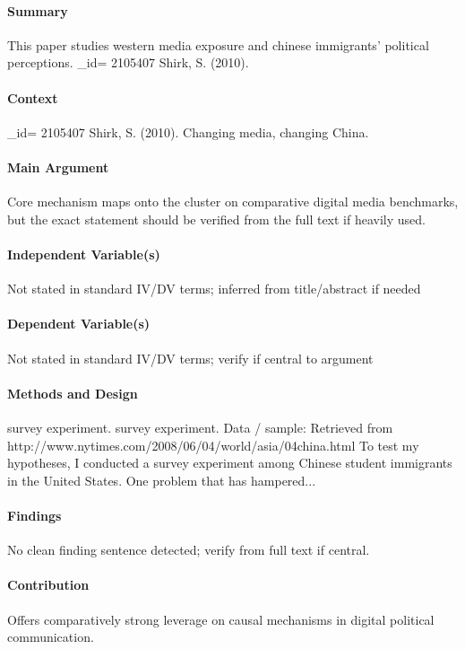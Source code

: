 \documentclass[12pt]{article}
\begin{document}
\paragraph{Summary} This paper studies western media exposure and chinese immigrants' political perceptions. \_id= 2105407 Shirk, S. (2010).

\paragraph{Context} \_id= 2105407 Shirk, S. (2010). Changing media, changing China.

\paragraph{Main Argument} Core mechanism maps onto the cluster on comparative digital media benchmarks, but the exact statement should be verified from the full text if heavily used.

\paragraph{Independent Variable(s)} Not stated in standard IV/DV terms; inferred from title/abstract if needed

\paragraph{Dependent Variable(s)} Not stated in standard IV/DV terms; verify if central to argument

\paragraph{Methods and Design} survey experiment. survey experiment. Data / sample: Retrieved from http://www.nytimes.com/2008/06/04/world/asia/04china.html To test my hypotheses, I conducted a survey experiment among Chinese student immigrants in the United States. One problem that has hampered...

\paragraph{Findings} No clean finding sentence detected; verify from full text if central.

\paragraph{Contribution} Offers comparatively strong leverage on causal mechanisms in digital political communication.
\end{document}
